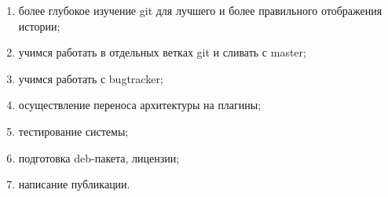 \begin{enumerate}
\item более глубокое изучение git для лучшего и более правильного отображения истории; 
\item учимся работать в отдельных ветках git и сливать с master;
\item учимся работать с bugtracker;
\item осуществление переноса архитектуры на плагины;
\item тестирование системы;
\item подготовка deb-пакета, лицензии;
\item написание публикации.
\end{enumerate}
